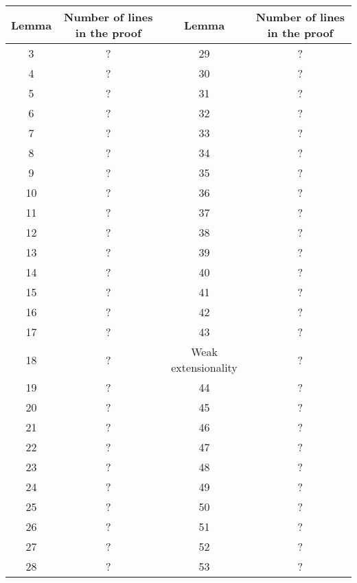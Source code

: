 \documentclass[a4paper]{article}
\begin{document}
\begin{center}
\begin{tabular}{|c|c||c|c|}
\hline Lemma & Number of lines in the proof & Lemma & Number of lines in the proof \\
\hline 3 & ? & 29 & ? \\
\hline 4 & ? & 30 & ? \\
\hline 5 & ? & 31 & ? \\
\hline 6 & ? & 32 & ? \\
\hline 7 & ? & 33 & ? \\
\hline 8 & ? & 34 & ? \\
\hline 9 & ? & 35 & ? \\
\hline 10 & ? & 36 & ? \\
\hline 11 & ? & 37 & ? \\
\hline 12 & ? & 38 & ? \\
\hline 13 & ? & 39 & ? \\
\hline 14 & ? & 40 & ? \\
\hline 15 & ? & 41 & ? \\
\hline 16 & ? & 42 & ? \\
\hline 17 & ? & 43 & ? \\
\hline 18 & ? & Weak extensionality & ? \\
\hline 19 & ? & 44 & ? \\
\hline 20 & ? & 45 & ? \\
\hline 21 & ? & 46 & ? \\
\hline 22 & ? & 47 & ? \\
\hline 23 & ? & 48 & ? \\
\hline 24 & ? & 49 & ? \\
\hline 25 & ? & 50 & ? \\
\hline 26 & ? & 51 & ? \\
\hline 27 & ? & 52 & ? \\
\hline 28 & ? & 53 & ? \\
\hline
\end{tabular}
\end{center}

\printbibliography
\end{document}

